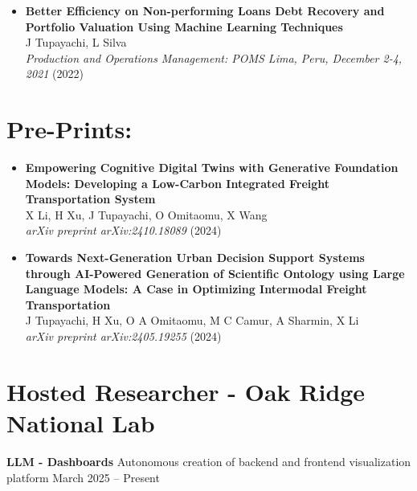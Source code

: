 \documentclass[10pt, letterpaper]{article}
\newenvironment{twocolentry}[2][]{
    \onecolentry
    \def\secondColumn{#2}
    \setcolumnwidth{\fill, 4.5 cm}
    \begin{paracol}{2}
}{
    \switchcolumn \raggedleft \secondColumn
    \end{paracol}
    \endonecolentry
} %
\begin{document}
\begin{itemize}[left=0pt]
        \item \textbf{Better Efficiency on Non-performing Loans Debt Recovery and Portfolio Valuation Using Machine Learning Techniques} \\
        J Tupayachi, L Silva \\
        \textit{Production and Operations Management: POMS Lima, Peru, December 2-4, 2021} (2022) \\
    
    

    \end{itemize}
    

    \section*{Pre-Prints:}

    \begin{itemize}[left=0pt] 

        \item \textbf{Empowering Cognitive Digital Twins with Generative Foundation Models: Developing a Low-Carbon Integrated Freight Transportation System} \\
        X Li, H Xu, J Tupayachi, O Omitaomu, X Wang \\
        \textit{arXiv preprint arXiv:2410.18089} (2024) \\



        \item \textbf{Towards Next-Generation Urban Decision Support Systems through AI-Powered Generation of Scientific Ontology using Large Language Models: A Case in Optimizing Intermodal Freight Transportation} \\
        J Tupayachi, H Xu, O A Omitaomu, M C Camur, A Sharmin, X Li \\
        \textit{arXiv preprint arXiv:2405.19255} (2024)

    \end{itemize}
    

    \section*{Hosted Researcher - Oak Ridge National Lab}
    \small

    \vspace{0.3cm} \begin{twocolentry}{March 2025 – Present} \textbf{LLM - Dashboards} \textbar Autonomous creation of backend and frontend visualization platform \end{twocolentry}
    
\end{document}
